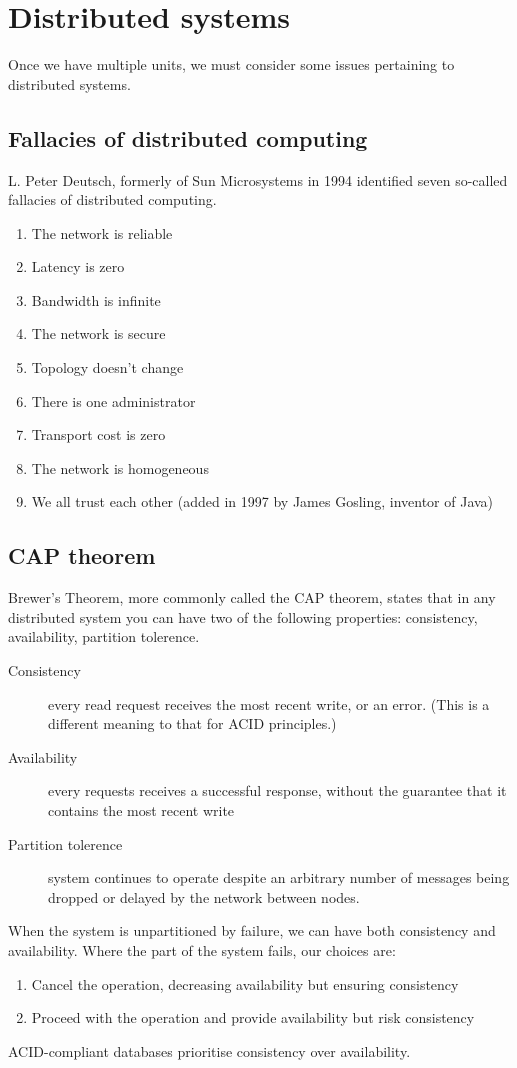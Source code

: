 \documentclass{pgnotes}
\begin{document}
\section{Distributed systems}

Once we have multiple units, we must consider some issues pertaining to distributed systems.

\subsection{Fallacies of distributed computing}

L. Peter Deutsch, formerly of Sun Microsystems in 1994 identified seven so-called fallacies of distributed computing.

\begin{enumerate}
\item The network is reliable
\item Latency is zero
\item Bandwidth is infinite
\item The network is secure
\item Topology doesn't change
\item There is one administrator
\item Transport cost is zero
\item The network is homogeneous
\item We all trust each other (added in 1997 by James Gosling, inventor of Java)
\end{enumerate}

\subsection{CAP theorem}

Brewer's Theorem, more commonly called the CAP theorem, states that in any distributed system you can have two of the following properties: consistency, availability, partition tolerence. 
\begin{description}
\item[Consistency] every read request receives the most recent write, or an error. (This is a different meaning to that for ACID principles.)
\item[Availability] every requests receives a successful response, without the guarantee that it contains the most recent write
\item[Partition tolerence] system continues to operate despite an arbitrary number of messages being dropped or delayed by the network between nodes. 
\end{description}
When the system is unpartitioned by failure, we can have both consistency and availability.
Where the part of the system fails, our choices are:
\begin{enumerate}
\item Cancel the operation, decreasing availability but ensuring consistency
\item Proceed with the operation and provide availability but risk consistency
\end{enumerate}
ACID-compliant databases prioritise consistency over availability.
\end{document}
